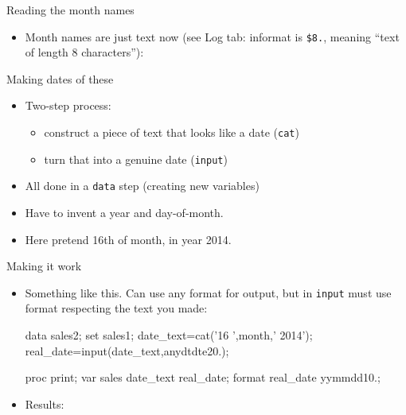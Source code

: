 \documentclass[unknownkeysallowed]{beamer}\usepackage[]{graphicx}\usepackage[]{color}
\begin{document}
\begin{frame}[fragile]{Reading the month names}
  
  \begin{itemize}
    
    \item Month names are just text now (see Log tab: informat is
      \texttt{\$8.}, meaning ``text of length 8 characters''):
      
      
      
  \end{itemize}
  
\end{frame}

\begin{frame}[fragile]{Making dates of these}
  
  \begin{itemize}
  \item Two-step process:
    \begin{itemize}
    \item construct a piece of text that looks like a date (\texttt{cat})
    \item turn that into a genuine date (\texttt{input})
    \end{itemize}
  \item All done in a \texttt{data} step (creating new variables)
  \item Have to invent a year and day-of-month.
    
  \item Here pretend 16th of month, in year 2014.
  \end{itemize}
  
\end{frame}

\begin{frame}[fragile]{Making it work}
  \begin{itemize}
  \item Something like this. Can use any format for output, but in
    \texttt{input} must use format respecting the text you made:
    
    \begin{small}
    \begin{Sascode}[store=nubiv]
data sales2;
  set sales1;
  date_text=cat('16 ',month,' 2014');
  real_date=input(date_text,anydtdte20.);
  
proc print;  
  var sales date_text real_date;
  format real_date yymmdd10.;
    \end{Sascode}
      
    \end{small}
    
    \item Results:
      
  \end{itemize}
\end{frame}
\end{document}
